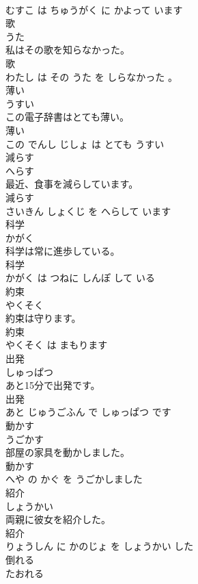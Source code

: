 \documentclass[8pt]{extreport}
\begin{document}
\begin{CJK}{UTF8}{min}
\\	むすこ は ちゅうがく に かよって います			
\\	歌	
\\	うた			
\\	私はその歌を知らなかった。	
\\	歌 
\\	わたし は その うた を しらなかった 。			
\\	薄い	
\\	うすい			
\\	この電子辞書はとても薄い。	
\\	薄い 
\\	この でんし じしょ は とても うすい			
\\	減らす	
\\	へらす			
\\	最近、食事を減らしています。	
\\	減らす 
\\	さいきん しょくじ を へらして います			
\\	科学	
\\	かがく			
\\	科学は常に進歩している。	
\\	科学 
\\	かがく は つねに しんぽ して いる			
\\	約束	
\\	やくそく			
\\	約束は守ります。	
\\	約束 
\\	やくそく は まもります			
\\	出発	
\\	しゅっぱつ			
\\	あと15分で出発です。	
\\	出発 
\\	あと じゅうごふん で しゅっぱつ です			
\\	動かす	
\\	うごかす			
\\	部屋の家具を動かしました。	
\\	動かす 
\\	へや の かぐ を うごかしました			
\\	紹介	
\\	しょうかい			
\\	両親に彼女を紹介した。	
\\	紹介 
\\	りょうしん に かのじょ を しょうかい した			
\\	倒れる	
\\	たおれる			

\end{CJK}
\end{document}
